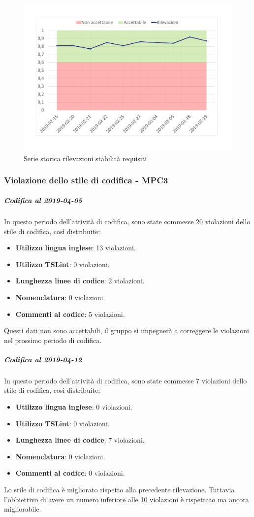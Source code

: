 \begin{figure}[H]
	\centering
	\includegraphics[scale=0.6]{images/resoconto/MPC2Chart.pdf}
	\caption{Serie storica rilevazioni stabilità requisiti}	
\end{figure}


\subsubsection{Violazione dello stile di codifica - MPC3}

\subparagraph{Codifica al 2019-04-05}
In questo periodo dell'attività di codifica, sono state commesse 20 violazioni dello stile di codifica, così distribuite:
 \begin{itemize}
 	\item \textbf{Utilizzo lingua inglese}: 13 violazioni.
 	\item \textbf{Utilizzo TSLint}: 0 violazioni.
 	\item \textbf{Lunghezza linee di codice}: 2 violazioni.
 	\item \textbf{Nomenclatura}: 0 violazioni.
 	\item \textbf{Commenti al codice}: 5 violazioni.
 \end{itemize}
Questi dati non sono accettabili, il gruppo si impegnerà a correggere le violazioni nel prossimo periodo di codifica.

\subparagraph{Codifica al 2019-04-12}
In questo periodo dell'attività di codifica, sono state commesse 7 violazioni dello stile di codifica, così distribuite:
 \begin{itemize}
 	\item \textbf{Utilizzo lingua inglese}: 0 violazioni.
 	\item \textbf{Utilizzo TSLint}: 0 violazioni.
 	\item \textbf{Lunghezza linee di codice}: 7 violazioni.
 	\item \textbf{Nomenclatura}: 0 violazioni.
 	\item \textbf{Commenti al codice}: 0 violazioni.
 \end{itemize}
Lo stile di codifica è migliorato rispetto alla precedente rilevazione. Tuttavia l'obbiettivo di avere un numero inferiore alle 10 violazioni è rispettato ma ancora migliorabile.

